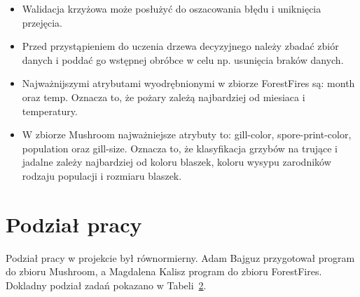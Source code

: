 \documentclass[10pt,a4paper]{article}
\begin{document}
\begin{itemize}
	\item Walidacja krzyżowa może posłużyć do oszacowania błędu i uniknięcia przejęcia.

	\item Przed przystąpieniem do uczenia drzewa decyzyjnego należy zbadać zbiór danych i poddać go wstępnej obróbce w celu np. usunięcia braków danych.

	\item Najważnijszymi atrybutami wyodrębnionymi w zbiorze ForestFires są: month oraz temp. Oznacza to, że pożary zależą najbardziej od miesiaca i temperatury. 
	
	\item W zbiorze Mushroom najważniejsze atrybuty to: gill-color, spore-print-color, population oraz gill-size. Oznacza to, że klasyfikacja grzybów na trujące i jadalne zależy najbardziej od koloru blaszek, koloru wysypu zarodników rodzaju populacji i rozmiaru blaszek.

\end{itemize}

\setcounter{page}{40}

\section{Podział pracy}
Podział pracy w projekcie był równormierny. Adam Bajguz przygotował program do zbioru Mushroom, a Magdalena Kalisz program do zbioru ForestFires. Dokladny podział zadań pokazano w Tabeli~\hyperref[tab:podzial]{2}.

\setlength{\extrarowheight}{4pt}
\end{document}
